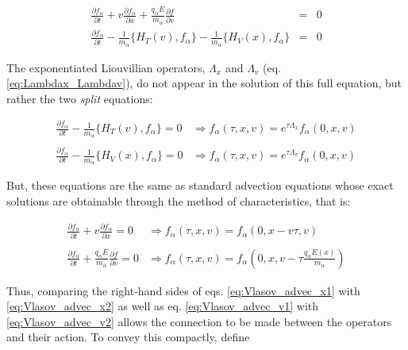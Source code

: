 \documentclass[11pt,titlepage]{report}
\begin{document}
\begin{eqnarray*}
\frac{\partial f_{\alpha}}{\partial t} + v\frac{\partial f_{\alpha}}{\partial x} + \frac{q_{\alpha}E}{m_{\alpha}}\frac{\partial f}{\partial v} & = & 0 \\
\frac{\partial f_{\alpha}}{\partial t} - \frac{1}{m_{\alpha}}\{H_T(v),f_{\alpha}\} -  \frac{1}{m_{\alpha}}\{H_V(x),f_{\alpha}\}  & = & 0
\end{eqnarray*}

\noindent The exponentiated Liouvillian operators, $\Lambda_x$ and $\Lambda_v$ (eq. \eqref{eq:Lambdax_Lambdav}), do not appear in the solution of this full equation, but rather the two \emph{split} equations:

\begin{subequations}
\begin{align}
\frac{\partial f_{\alpha}}{\partial t} - \frac{1}{m_{\alpha}}\{H_T(v),f_{\alpha}\}  =  0 & \Rightarrow  f_{\alpha}(\tau ,x,v) = e^{\tau \Lambda_x}f_{\alpha}(0,x,v) \label{eq:Vlasov_advec_x1}\\
& \nonumber \\
\frac{\partial f_{\alpha}}{\partial t} - \frac{1}{m_{\alpha}}\{H_V(x),f_{\alpha}\}  =  0 & \Rightarrow  f_{\alpha}(\tau ,x,v) = e^{\tau \Lambda_v}f_{\alpha}(0,x,v) \label{eq:Vlasov_advec_v1}
\end{align}
\end{subequations}

\noindent But, these equations are the same as standard advection equations whose exact solutions are obtainable through the method of characteristics, that is:

\begin{subequations}
\begin{align}
\frac{\partial f_{\alpha}}{\partial t} + v\frac{\partial f_{\alpha}}{\partial x}  =  0 & \Rightarrow  f_{\alpha}(\tau ,x,v) = f_{\alpha}(0,x-v\tau,v) \label{eq:Vlasov_advec_x2}\\
& \nonumber \\
\frac{\partial f_{\alpha}}{\partial t} + \frac{q_{\alpha}E}{m_{\alpha}}\frac{\partial f}{\partial v}  =  0  & \Rightarrow  f_{\alpha}(\tau ,x,v) =  f_{\alpha}(0,x,v - \tau \tfrac{q_{\alpha}E(x)}{m_{\alpha}})\label{eq:Vlasov_advec_v2}
\end{align}
\end{subequations}

\noindent Thus, comparing the right-hand sides of eqs. \eqref{eq:Vlasov_advec_x1} with \eqref{eq:Vlasov_advec_x2} as well as eq. \eqref{eq:Vlasov_advec_v1} with \eqref{eq:Vlasov_advec_v2} allows the connection to be made between the operators and their action. To convey this compactly, define
\end{document}
